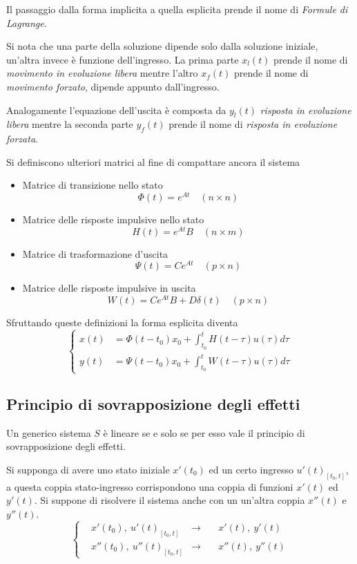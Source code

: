 Il passaggio dalla forma implicita a quella esplicita prende il nome di
\textit{Formule di Lagrange}.

Si nota che una parte della soluzione dipende solo dalla soluzione iniziale,
un'altra invece è funzione dell'ingresso.
La prima parte $x_l(t)$ prende il nome di \textit{movimento in evoluzione
libera} mentre l'altro $x_f(t)$ prende il nome di \textit{movimento forzato},
dipende appunto dall'ingresso.

Analogamente l'equazione dell'uscita è composta da $y_l(t)$ \textit{risposta in
evoluzione libera} mentre la seconda parte $y_f(t)$ prende il nome di
\textit{risposta in evoluzione forzata}.

Si definiscono ulteriori matrici al fine di compattare ancora il sistema
\begin{itemize}
\item Matrice di transizione nello stato
$$
\Phi(t) = e^{At}\quad (n\times n)
$$
\item Matrice delle risposte impulsive nello stato
$$
H(t) = e^{At}B \quad (n\times m)
$$
\item Matrice di trasformazione d'uscita
$$
\Psi(t) = Ce^{At} \quad (p\times n)
$$
\item Matrice delle risposte impulsive in uscita
$$
W(t) = Ce^{At}B + D\delta(t) \quad (p\times n)
$$
\end{itemize}
Sfruttando queste definizioni la forma esplicita diventa
$$\left\{\begin{aligned}
x(t) &= \Phi(t-t_0) x_0 + \int_{t_0}^t H(t-\tau)u(\tau)d\tau \\
y(t) &= \Psi(t-t_0) x_0 + \int_{t_0}^t W(t-\tau)u(\tau)d\tau
\end{aligned}\right.
$$

\newpage
\subsection{Principio di sovrapposizione degli effetti}
Un generico sistema $S$ è lineare se e solo se per esso vale il principio di
sovrapposizione degli effetti.

Si supponga di avere uno stato iniziale $x'(t_0)$ ed un certo ingresso
$u'(t)_{[t_0,t]}$, a questa coppia stato-ingresso corrispondono una coppia di
funzioni $x'(t)$ ed $y'(t)$.
Si suppone di risolvere il sistema anche con un un'altra coppia $x''(t)$ e
$y''(t)$.
$$\left\{\begin{aligned}
&x'(t_0),\ u'(t)_{[t_0,t]} &\longrightarrow\quad &x'(t),\ y'(t) \\
&x''(t_0),\ u''(t)_{[t_0,t]} &\longrightarrow\quad & x''(t),\ y''(t)
\end{aligned}\right.
$$

